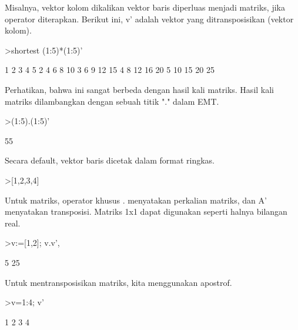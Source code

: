 \documentclass[a4paper,10pt]{article}
\begin{document}
\begin{eulernotebook}
\begin{eulercomment}
Misalnya, vektor kolom dikalikan vektor baris diperluas menjadi
matriks, jika operator diterapkan. Berikut ini, v' adalah vektor yang
ditransposisikan (vektor kolom).
\end{eulercomment}
\begin{eulerprompt}
>shortest (1:5)*(1:5)'
\end{eulerprompt}
\begin{euleroutput}
       1      2      3      4      5 
       2      4      6      8     10 
       3      6      9     12     15 
       4      8     12     16     20 
       5     10     15     20     25 
\end{euleroutput}
\begin{eulercomment}
Perhatikan, bahwa ini sangat berbeda dengan hasil kali matriks. Hasil
kali matriks dilambangkan dengan sebuah titik "." dalam EMT.
\end{eulercomment}
\begin{eulerprompt}
>(1:5).(1:5)'
\end{eulerprompt}
\begin{euleroutput}
  55
\end{euleroutput}
\begin{eulercomment}
Secara default, vektor baris dicetak dalam format ringkas.
\end{eulercomment}
\begin{eulerprompt}
>[1,2,3,4]
\end{eulerprompt}
\begin{euleroutput}
  [1,  2,  3,  4]
\end{euleroutput}
\begin{eulercomment}
Untuk matriks, operator khusus . menyatakan perkalian matriks, dan A'
menyatakan transposisi. Matriks 1x1 dapat digunakan seperti halnya
bilangan real.
\end{eulercomment}
\begin{eulerprompt}
>v:=[1,2]; v.v', %
\end{eulerprompt}
\begin{euleroutput}
  5
  25
\end{euleroutput}
\begin{eulercomment}
Untuk mentransposisikan matriks, kita menggunakan apostrof.
\end{eulercomment}
\begin{eulerprompt}
>v=1:4; v'
\end{eulerprompt}
\begin{euleroutput}
              1 
              2 
              3 
              4 

\end{euleroutput}
\end{eulernotebook}
\end{document}
